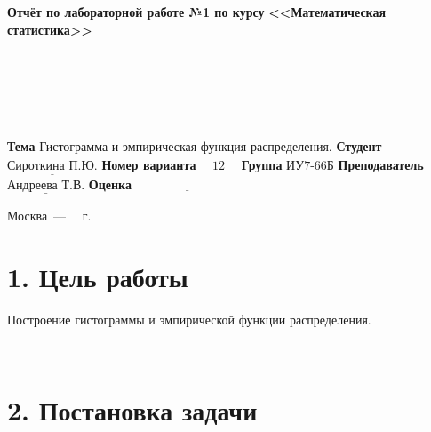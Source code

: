 \documentclass[12pt]{report}
\begin{document}
\begin{titlepage}
	
	\begin{center}
		\noindent\begin{minipage}{1.3\textwidth}\centering
			\Large\textbf{  Отчёт по лабораторной работе №1 по курсу}\newline\newline
			\textbf{<<Математическая статистика>>}\newline
		\end{minipage}
	\end{center}
	
	~\\\\\\\\\\
	\large
	\noindent\textbf{Тема } $\underline{\text{Гистограмма и эмпирическая функция распределения.}}$\newline\newline
	\noindent\textbf{Студент } $\underline{\text{Сироткина П.Ю.}}$\newline\newline
	\noindent\textbf{Номер варианта} $\underline{\text{~~~12~~~}}$\newline\newline
	\noindent\textbf{Группа } $\underline{\text{ИУ7-66Б}}$\newline\newline
	\noindent\textbf{Преподаватель } $\underline{\text{Андреева Т.В.}}$\newline\newline
	\noindent\textbf{Оценка } $\underline{\text{~~~~~~~~~~~~~~~~~~~~~~~~~}}$\newline\newline
	
	\begin{center}
		\vfill
		Москва~---~\the\year
		~г.
	\end{center}
\end{titlepage}

\section*{1. Цель работы}

Построение гистограммы и эмпирической функции распределения.

~\

\section*{2. Постановка задачи}
\end{document}
